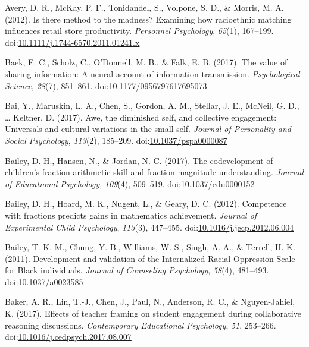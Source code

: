 \documentclass[english,man]{apa6}
\theoremstyle{definition}
\theoremstyle{definition}
\theoremstyle{definition}
\theoremstyle{remark}
\begin{document}
\hypertarget{ref-Avery2012}{}
Avery, D. R., McKay, P. F., Tonidandel, S., Volpone, S. D., \& Morris,
M. A. (2012). Is there method to the madness? Examining how racioethnic
matching influences retail store productivity. \emph{Personnel
Psychology}, \emph{65}(1), 167--199.
doi:\href{https://doi.org/10.1111/j.1744-6570.2011.01241.x}{10.1111/j.1744-6570.2011.01241.x}

\hypertarget{ref-Baek2017}{}
Baek, E. C., Scholz, C., O'Donnell, M. B., \& Falk, E. B. (2017). The
value of sharing information: A neural account of information
transmission. \emph{Psychological Science}, \emph{28}(7), 851--861.
doi:\href{https://doi.org/10.1177/0956797617695073}{10.1177/0956797617695073}

\hypertarget{ref-Bai2017}{}
Bai, Y., Maruskin, L. A., Chen, S., Gordon, A. M., Stellar, J. E.,
McNeil, G. D., \ldots{} Keltner, D. (2017). Awe, the diminished self,
and collective engagement: Universals and cultural variations in the
small self. \emph{Journal of Personality and Social Psychology},
\emph{113}(2), 185--209.
doi:\href{https://doi.org/10.1037/pspa0000087}{10.1037/pspa0000087}

\hypertarget{ref-Bailey2017}{}
Bailey, D. H., Hansen, N., \& Jordan, N. C. (2017). The codevelopment of
children's fraction arithmetic skill and fraction magnitude
understanding. \emph{Journal of Educational Psychology}, \emph{109}(4),
509--519.
doi:\href{https://doi.org/10.1037/edu0000152}{10.1037/edu0000152}

\hypertarget{ref-Bailey2012}{}
Bailey, D. H., Hoard, M. K., Nugent, L., \& Geary, D. C. (2012).
Competence with fractions predicts gains in mathematics achievement.
\emph{Journal of Experimental Child Psychology}, \emph{113}(3),
447--455.
doi:\href{https://doi.org/10.1016/j.jecp.2012.06.004}{10.1016/j.jecp.2012.06.004}

\hypertarget{ref-Bailey2011}{}
Bailey, T.-K. M., Chung, Y. B., Williams, W. S., Singh, A. A., \&
Terrell, H. K. (2011). Development and validation of the Internalized
Racial Oppression Scale for Black individuals. \emph{Journal of
Counseling Psychology}, \emph{58}(4), 481--493.
doi:\href{https://doi.org/10.1037/a0023585}{10.1037/a0023585}

\hypertarget{ref-Baker2017}{}
Baker, A. R., Lin, T.-J., Chen, J., Paul, N., Anderson, R. C., \&
Nguyen-Jahiel, K. (2017). Effects of teacher framing on student
engagement during collaborative reasoning discussions.
\emph{Contemporary Educational Psychology}, \emph{51}, 253--266.
doi:\href{https://doi.org/10.1016/j.cedpsych.2017.08.007}{10.1016/j.cedpsych.2017.08.007}
\end{document}
